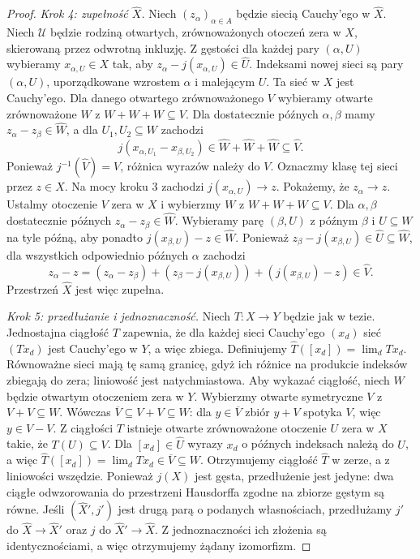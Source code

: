 \documentclass[11pt,a4paper]{article}
\numberwithin{equation}{section}
\theoremstyle{plain}
\theoremstyle{definition}
\theoremstyle{remark}
\begin{document}
\begin{proof}
\emph{Krok 4: zupełność $\widehat X$.}
Niech $(z_\alpha)_{\alpha\in A}$ będzie siecią Cauchy'ego
w $\widehat X$. Niech $\mathcal U$ będzie rodziną otwartych,
zrównoważonych otoczeń zera w $X$, skierowaną przez odwrotną
inkluzję. Z gęstości dla każdej pary $(\alpha,U)$ wybieramy
$x_{\alpha,U}\in X$ tak, aby
$z_\alpha-j(x_{\alpha,U})\in\widehat U$.
Indeksami nowej sieci są pary $(\alpha,U)$, uporządkowane
wzrostem $\alpha$ i malejącym $U$.
Ta sieć w $X$ jest Cauchy'ego. Dla danego otwartego
zrównoważonego $V$ wybieramy otwarte zrównoważone $W$
z $W+W+W\subseteq V$. Dla dostatecznie późnych
$\alpha,\beta$ mamy $z_\alpha-z_\beta\in\widehat W$,
a dla $U_1,U_2\subseteq W$ zachodzi
\[
 j(x_{\alpha,U_1}-x_{\beta,U_2})
 \in\widehat W+\widehat W+\widehat W
 \subseteq\widehat V.
\]
Ponieważ $j^{-1}(\widehat V)=V$, różnica wyrazów należy do $V$.
Oznaczmy klasę tej sieci przez $z\in\widehat X$.
Na mocy kroku 3 zachodzi $j(x_{\alpha,U})\to z$.
Pokażemy, że $z_\alpha\to z$. Ustalmy otoczenie
$V$ zera w $X$ i wybierzmy $W$ z $W+W+W\subseteq V$.
Dla $\alpha,\beta$ dostatecznie późnych
$z_\alpha-z_\beta\in\widehat W$.
Wybieramy parę $(\beta,U)$ z późnym $\beta$ i $U\subseteq W$
na tyle późną, aby ponadto
$j(x_{\beta,U})-z\in\widehat W$. Ponieważ
$z_\beta-j(x_{\beta,U})\in\widehat U\subseteq\widehat W$,
dla wszystkich odpowiednio późnych $\alpha$ zachodzi
\[
 z_\alpha-z=(z_\alpha-z_\beta)
 +(z_\beta-j(x_{\beta,U}))+(j(x_{\beta,U})-z)
 \in\widehat V.
\]
Przestrzeń $\widehat X$ jest więc zupełna.

\emph{Krok 5: przedłużanie i jednoznaczność.}
Niech $T:X\to Y$ będzie jak w tezie. Jednostajna ciągłość
$T$ zapewnia, że dla każdej sieci Cauchy'ego $(x_d)$
sieć $(Tx_d)$ jest Cauchy'ego w $Y$, a więc zbiega.
Definiujemy
$\widehat T([x_d])=\lim_d Tx_d$.
Równoważne sieci mają tę samą granicę, gdyż ich różnice
na produkcie indeksów zbiegają do zera; liniowość jest
natychmiastowa. Aby wykazać ciągłość, niech $W$ będzie
otwartym otoczeniem zera w $Y$. Wybierzmy otwarte
symetryczne $V$ z $V+V\subseteq W$. Wówczas
$\overline V\subseteq V+V\subseteq W$: dla $y\in\overline V$
zbiór $y+V$ spotyka $V$, więc $y\in V-V$.
Z ciągłości $T$ istnieje otwarte zrównoważone otoczenie
$U$ zera w $X$ takie, że $T(U)\subseteq V$.
Dla $[x_d]\in\widehat U$ wyrazy $x_d$ o późnych indeksach
należą do $U$, a więc
$\widehat T([x_d])=\lim_d Tx_d\in\overline V\subseteq W$.
Otrzymujemy ciągłość $\widehat T$ w zerze, a z liniowości
wszędzie. Ponieważ $j(X)$ jest gęsta, przedłużenie jest
jedyne: dwa ciągłe odwzorowania do przestrzeni Hausdorffa
zgodne na zbiorze gęstym są równe. Jeśli
$(\widehat X',j')$ jest drugą parą o podanych własnościach,
przedłużamy $j'$ do $\widehat X\to\widehat X'$ oraz $j$
do $\widehat X'\to\widehat X$. Z jednoznaczności ich
złożenia są identycznościami, a więc otrzymujemy żądany
izomorfizm.
\end{proof}
\end{document}

